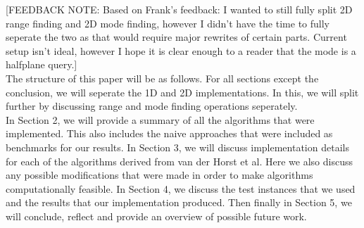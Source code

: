 \documentclass{article}
\newcommand{\fbnote}[1]{{\color{blue}[FEEDBACK NOTE: #1]\\}}
\begin{document}
{    \fbnote{Based on Frank's feedback: I wanted to still fully split 2D range finding and 2D mode finding, however I didn't have the time to fully seperate the two as that would require major rewrites of certain parts. Current setup isn't ideal, however I hope it is clear enough to a reader that the mode is a halfplane query.}
    The structure of this paper will be as follows. For all sections except the conclusion, we will seperate the 1D and 2D implementations. In this, we will split further by discussing range and mode finding operations seperately.\\
     In Section 2, we will provide a summary of all the algorithms that were implemented. This also includes the naive approaches that were included as benchmarks for our results. In Section 3, we will discuss implementation details for each of the algorithms derived from van der Horst et al. Here we also discuss any possible modifications that were made in order to make algorithms computationally feasible. In Section 4, we discuss the test instances that we used and the results that our implementation produced. Then finally in Section 5, we will conclude, reflect and provide an overview of possible future work. 
}
\end{document}
